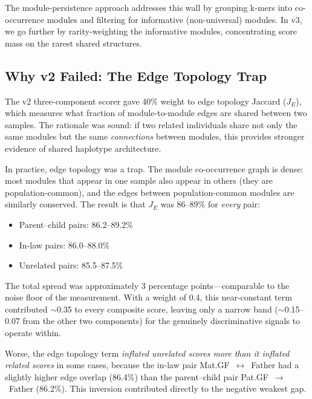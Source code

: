 \documentclass{../yalumba}
\begin{document}
\noindent The module-persistence approach addresses this wall by grouping
k-mers into co-occurrence modules and filtering for informative (non-universal)
modules.  In v3, we go further by rarity-weighting the informative modules,
concentrating score mass on the rarest shared structures.

\subsection{Why v2 Failed: The Edge Topology Trap}
\label{sec:edge-trap}

The v2 three-component scorer gave 40\% weight to edge topology Jaccard
($J_E$), which measures what fraction of module-to-module edges are shared
between two samples.  The rationale was sound: if two related individuals
share not only the same modules but the same \emph{connections} between
modules, this provides stronger evidence of shared haplotype architecture.

In practice, edge topology was a trap.  The module co-occurrence graph is
dense: most modules that appear in one sample also appear in others (they are
population-common), and the edges between population-common modules are
similarly conserved.  The result is that $J_E$ was 86--89\% for \emph{every}
pair:

\begin{itemize}
  \item Parent--child pairs: 86.2--89.2\%
  \item In-law pairs: 86.0--88.0\%
  \item Unrelated pairs: 85.5--87.5\%
\end{itemize}


The total spread was approximately 3 percentage points---comparable to the
noise floor of the measurement.  With a weight of 0.4, this near-constant
term contributed $\sim$0.35 to every composite score, leaving only a narrow
band ($\sim$0.15--0.07 from the other two components) for the genuinely
discriminative signals to operate within.

Worse, the edge topology term \emph{inflated unrelated scores more than it
inflated related scores} in some cases, because the in-law pair
Mat.GF~$\leftrightarrow$~Father had a slightly higher edge overlap (86.4\%)
than the parent--child pair Pat.GF~$\to$~Father (86.2\%).  This inversion
contributed directly to the negative weakest gap.
\end{document}
